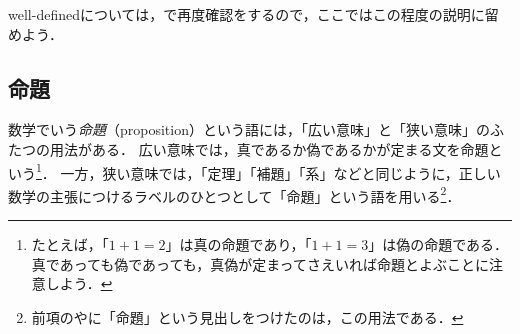well-definedについては，で再度確認をするので，ここではこの程度の説明に留めよう．

\subsection{命題}

数学でいう\emph{命題}（proposition）という語には，「広い意味」と「狭い意味」のふたつの用法がある．
広い意味では，真であるか偽であるかが定まる文を命題という\footnote{たとえば，「$1+1=2$」は真の命題であり，「$1+1=3$」は偽の命題である．真であっても偽であっても，真偽が定まってさえいれば命題とよぶことに注意しよう．}．
一方，狭い意味では，「定理」「補題」「系」などと同じように，正しい数学の主張につけるラベルのひとつとして「命題」という語を用いる\footnote{前項のやに「命題」という見出しをつけたのは，この用法である．}．

